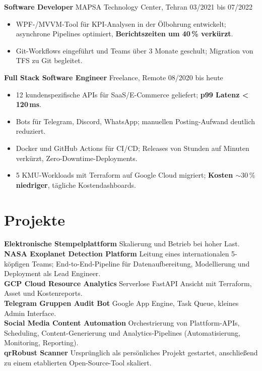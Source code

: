 \documentclass[10pt]{article}
\begin{document}
\textbf{Software Developer} \quad MAPSA Technology Center, Tehran \hfill 03/2021 bis 07/2022\\[-1pt]
\begin{itemize}
  \item WPF-/MVVM-Tool für KPI-Analysen in der Ölbohrung entwickelt; asynchrone Pipelines optimiert, \textbf{Berichtszeiten um 40\,\% verkürzt}.
  \item Git-Workflows eingeführt und Teams über 3 Monate geschult; Migration von TFS zu Git begleitet.
\end{itemize}

\textbf{Full Stack Software Engineer} \quad Freelance, Remote \hfill 08/2020 bis heute \\[-1pt]
\begin{itemize}
  \item 12 kundenspezifische APIs für SaaS/E-Commerce geliefert; \textbf{p99 Latenz < 120\,ms}.
  \item Bots für Telegram, Discord, WhatsApp; manuellen Posting-Aufwand deutlich reduziert.
  \item Docker und GitHub Actions für CI/CD; Releases von Stunden auf Minuten verkürzt, Zero-Downtime-Deployments.
  \item 5 KMU-Workloads mit Terraform auf Google Cloud migriert; \textbf{Kosten \(\sim 30\,\%\) niedriger}, tägliche Kostendashboards.
\end{itemize}

\section*{Projekte}
\textbf{Elektronische Stempelplattform} \quad Skalierung und Betrieb bei hoher Last.\\
\textbf{NASA Exoplanet Detection Platform} \quad Leitung eines internationalen 5-köpfigen Teams; End-to-End-Pipeline für Datenaufbereitung, Modellierung und Deployment als Lead Engineer.\\
\textbf{GCP Cloud Resource Analytics} \quad Serverlose FastAPI Ansicht mit Terraform, Asset und Kostenreports.\\
\textbf{Telegram Gruppen Audit Bot} \quad Google App Engine, Task Queue, kleines Admin Interface.\\
\textbf{Social Media Content Automation} \quad Orchestrierung von Plattform-APIs, Scheduling, Content-Generierung und Analytics-Pipelines (Automatisierung, Monitoring, Reporting).\\
\textbf{qrRobust Scanner} \quad Ursprünglich als persönliches Projekt gestartet, anschließend zu einem etablierten Open-Source-Tool skaliert.\\
\end{document}
